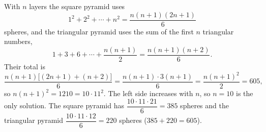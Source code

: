 With $n$ layers the square pyramid uses
\[
1^2+2^2+\cdots+n^2=\dfrac{n(n+1)(2n+1)}{6}
\]
spheres, and the triangular pyramid uses the sum of the first $n$ triangular numbers,
\[
1+3+6+\cdots+\dfrac{n(n+1)}{2}=\dfrac{n(n+1)(n+2)}{6}.
\]
Their total is
\[
\dfrac{n(n+1)\bigl[(2n+1)+(n+2)\bigr]}{6}=\dfrac{n(n+1)\cdot3(n+1)}{6}=\dfrac{n(n+1)^2}{2}=605 ,
\]
so $n(n+1)^2=1210=10\cdot11^2$. The left side increases with $n$, so $n=10$ is the only solution. The square pyramid has $\dfrac{10\cdot11\cdot21}{6}=\boxed{385}$ spheres and the triangular pyramid $\dfrac{10\cdot11\cdot12}{6}=\boxed{220}$ spheres ($385+220=605$).
